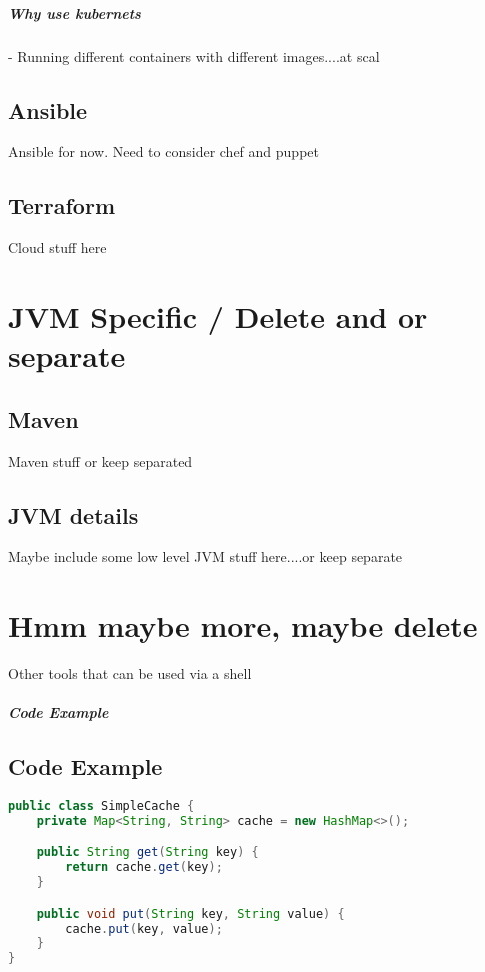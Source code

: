 \documentclass[a4paper, 11pt]{book}
\begin{document}
    \paragraph{Why use kubernets} - Running different containers with different images....at scal


    \section{Ansible}
    Ansible for now. Need to consider chef and puppet


    \section{Terraform}
    Cloud stuff here


    \chapter{JVM Specific / Delete and or separate}


    \section{Maven}
    Maven stuff or keep separated


    \section{JVM details}
    Maybe include some low level JVM stuff here....or keep separate


    \chapter{Hmm maybe more, maybe delete}
    Other tools that can be used via a shell

    \paragraph{Code Example}


    \section{Code Example}
    \begin{lstlisting}[language=Java, caption=Java Code for a Simple Cache]
public class SimpleCache {
    private Map<String, String> cache = new HashMap<>();

    public String get(String key) {
        return cache.get(key);
    }

    public void put(String key, String value) {
        cache.put(key, value);
    }
}
    \end{lstlisting}
\end{document}
